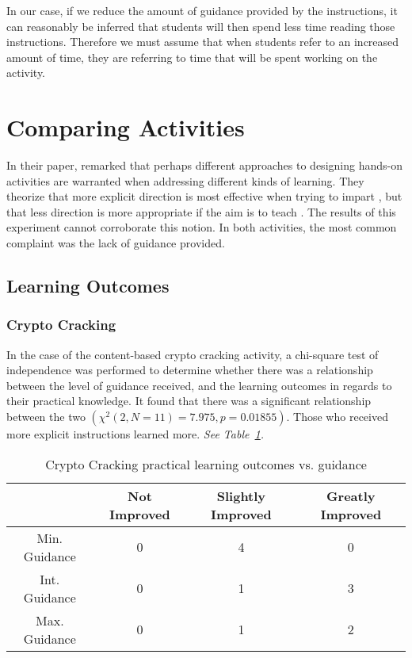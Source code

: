    In our case, if we reduce the amount of guidance provided by the instructions, it can reasonably be inferred that students will then spend less time reading those instructions. 
    Therefore we must assume that when students refer to an increased amount of time, they are referring to time that will be spent working on the activity. 

\section{Comparing Activities}
    In their paper, \citeauthor{R-Weiss} remarked that perhaps different approaches to designing hands-on activities are warranted when addressing different kinds of learning. 
    They theorize that more explicit direction is most effective when trying to impart , but that less direction is more appropriate if the aim is to teach . 
    The results of this experiment cannot corroborate this notion. 
    In both activities, the most common complaint was the lack of guidance provided. 
    
    \subsection{Learning Outcomes}

        \subsubsection*{Crypto Cracking}
            In the case of the content-based crypto cracking activity, a chi-square test of independence was performed to determine whether there was a relationship between the level of guidance received, and the learning outcomes in regards to their practical knowledge. 
            It found that there was a significant relationship between the two $(\chi^2(2, N=11)=7.975,  p = 0.01855)$. 
            Those who received more explicit instructions learned more. 
            \emph{See Table~\ref{tab:cc-pLO-v-g}.}

            \begin{table}
            \begin{center}
                \begin{tabular}{|c|c|c|c|}
                    \hline
                        & Not Improved & Slightly Improved & Greatly Improved \\
                    \hline
                    Min. Guidance & 0 & 4 & 0\\
                    \hline
                    Int. Guidance & 0 & 1 & 3\\
                    \hline
                    Max. Guidance & 0 & 1 & 2\\
                    \hline
                \end{tabular}

                \caption{Crypto Cracking practical learning outcomes vs. guidance}\label{tab:cc-pLO-v-g}
            \end{center}
            \end{table}

